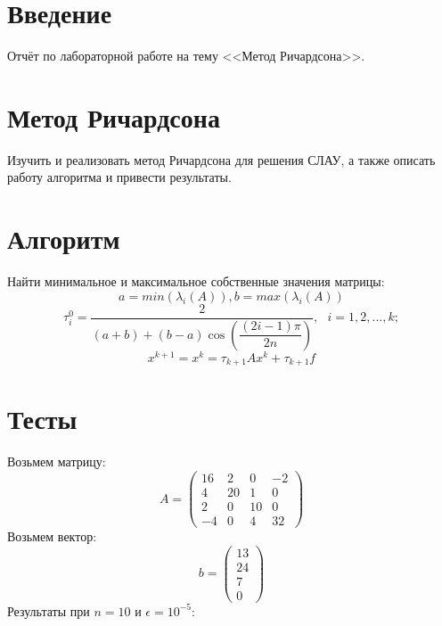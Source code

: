 \documentclass[14pt, titlepage,fleqn]{extarticle}
\begin{document}
	

	
	
	\newpage
	
	\tableofcontents   
	\clearpage
	\section*{Введение}
	Отчёт по лабораторной работе на тему <<Метод Ричардсона>>.	
	\newpage









	\section*{Метод Ричардсона}
	Изучить и реализовать метод Ричардсона для решения СЛАУ, а также описать работу алгоритма и
	привести результаты.

	\section*{Алгоритм}
	Найти минимальное и максимальное собственные значения матрицы:
	\[a = min(\lambda_i(A)), b = max(\lambda_i(A))\]	
	\[\tau^{0}_i = \dfrac{2}{(a + b) + (b-a)\cos\left(\dfrac{(2i-1)\pi}{2n}\right)},~~~i=1,2,...,k; \]
	\[x^{k+1} = x^k = \tau_{k+1}Ax^k + \tau_{k+1}f\]
	\section*{Тесты}
	Возьмем матрицу:
	\[A = \begin{pmatrix}
		16& 2& 0& -2\\
        4& 20& 1& 0\\
        2& 0& 10& 0\\
        -4& 0& 4& 32
	\end{pmatrix}\]
	Возьмем вектор:
	\[b =\begin{pmatrix}
		13\\
		24\\
		7\\
		0
	\end{pmatrix} \]
	\newpage
	Результаты при $n=10$ и $\epsilon = 10^{-5}$:
	\begin{figure}[H]
	\end{figure}
\end{document}

